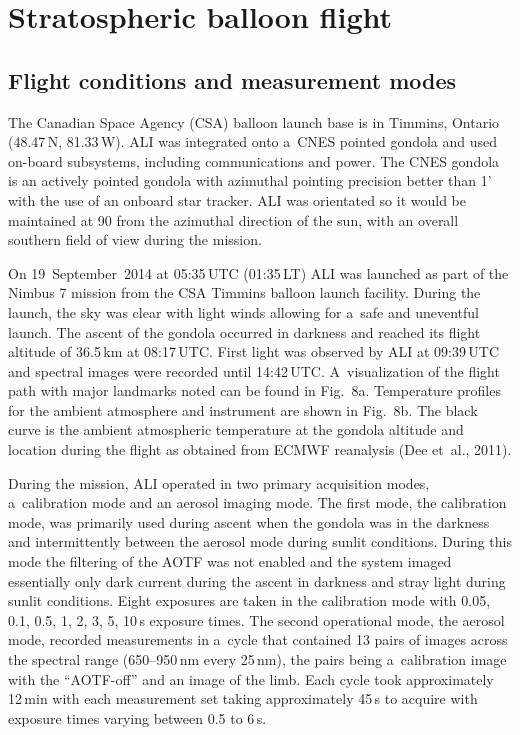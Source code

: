 \documentclass[amtd, online, hvmath]{copernicus}
\begin{document}
\section{Stratospheric balloon flight}
\subsection{Flight conditions and measurement modes}

The Canadian Space Agency (CSA) balloon launch base is in Timmins,
Ontario (48.47{\degree}\,N, 81.33{\degree}\,W). ALI was integrated
onto a~CNES pointed gondola and used on-board subsystems, including
communications and power. The CNES gondola is an actively pointed
gondola with azimuthal pointing precision better than 1' with the use
of an onboard star tracker. ALI was orientated so it would be
maintained at 90{\degree} from the azimuthal direction of the sun,
with an overall southern field of view during the mission.

On 19~September~2014 at 05:35\,UTC (01:35\,LT) ALI was launched as
part of the Nimbus 7 mission from the CSA Timmins balloon launch
facility.  During the launch, the sky was clear with light winds
allowing for a~safe and uneventful launch. The ascent of the gondola
occurred in darkness and reached its flight altitude of
36.5\,\unit{km} at 08:17\,UTC. First light was observed by ALI at
09:39\,UTC and spectral images were recorded until 14:42\,UTC.
A~visualization of the flight path with major landmarks noted can be
found in Fig.~8a. Temperature profiles for the ambient atmosphere and
instrument are shown in Fig.~8b. The black curve is the ambient
atmospheric temperature at the gondola altitude and location during
the flight as obtained from ECMWF reanalysis (Dee et~al., 2011).

During the mission, ALI operated in two primary acquisition modes,
a~calibration mode and an aerosol imaging mode. The first mode, the
calibration mode, was primarily used during ascent when the gondola
was in the darkness and intermittently between the aerosol mode during
sunlit conditions. During this mode the filtering of the AOTF was not
enabled and the system imaged essentially only dark current during the
ascent in darkness and stray light during sunlit conditions. Eight
exposures are taken in the calibration mode with 0.05, 0.1, 0.5, 1, 2,
3, 5, 10\,s exposure times. The second operational mode, the aerosol
mode, recorded measurements in a~cycle that contained 13 pairs of
images across the spectral range (650--950\,\unit{nm} every
25\,\unit{nm}), the pairs being a~calibration image with the
``AOTF-off'' and an image of the limb. Each cycle took approximately
12\,min with each measurement set taking approximately 45\,s to
acquire with exposure times varying between 0.5 to 6\,s.
\end{document}
